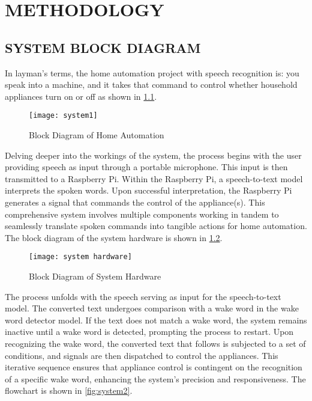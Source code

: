  \chapter{METHODOLOGY}

        \section{SYSTEM BLOCK DIAGRAM}
            In layman's terms, the home automation project with speech recognition is: you speak into a machine, and it takes that command to control whether household appliances turn on or off as shown in \ref{fig:system1}. 

        \begin{figure}[h]
            \centering
            \texttt{[image: system1]}
            \caption{Block Diagram of Home Automation}
            \label{fig:system1}
        \end{figure}

            Delving deeper into the workings of the system, the process begins with the user providing speech as input through a portable microphone. This input is then transmitted to a Raspberry Pi. Within the Raspberry Pi, a speech-to-text model interprets the spoken words. Upon successful interpretation, the Raspberry Pi generates a signal that commands the control of the appliance(s). This comprehensive system involves multiple components working in tandem to seamlessly translate spoken commands into tangible actions for home automation. The block diagram of the system hardware is shown in \ref{fig:system hardware}.

        \begin{figure}[h]
            \centering
            \texttt{[image: system hardware]}
            \caption{Block Diagram of System Hardware}
            \label{fig:system hardware}
        \end{figure}

            The process unfolds with the speech serving as input for the speech-to-text model. The converted text undergoes comparison with a wake word in the wake word detector model. If the text does not match a wake word, the system remains inactive until a wake word is detected, prompting the process to restart. Upon recognizing the wake word, the converted text that follows is subjected to a set of conditions, and signals are then dispatched to control the appliances. This iterative sequence ensures that appliance control is contingent on the recognition of a specific wake word, enhancing the system's precision and responsiveness. The flowchart is shown in \ref{fig:system2}.

